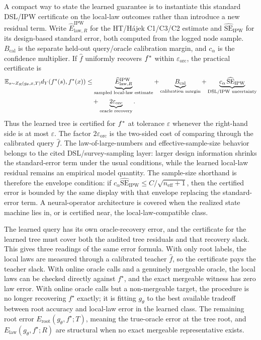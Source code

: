 A compact way to state the learned guarantee is to instantiate this standard
DSL/IPW certificate on the local-law outcomes rather than introduce a new
residual term. Write
\(\widehat E_{\mathrm{law},R}^{\mathrm{IPW}}\) for the HT/H\'ajek
C1/C3/C2 estimate and \(\widehat{\mathrm{SE}}_{\mathrm{IPW}}\) for its
design-based standard error, both computed from the logged node sample.
\(B_{\mathrm{cal}}\) is the separate held-out query/oracle calibration margin,
and \(c_\alpha\) is the confidence multiplier. If \(\widehat f\)
uniformly recovers \(f^\ast\) within \(\varepsilon_{\mathrm{orc}}\), the
practical certificate is
\[
\begin{aligned}
  \mathbb E_{s\sim Z_R(g_\theta,x,T)}
  d_Y(f^\ast(s),f^\ast(x))
  &\le
  \underbrace{\widehat E_{\mathrm{law},R}^{\mathrm{IPW}}}
    _{\text{sampled local-law estimate}}
  +
  \underbrace{B_{\mathrm{cal}}}
    _{\text{calibration margin}}
  +
  \underbrace{c_\alpha\,\widehat{\mathrm{SE}}_{\mathrm{IPW}}}
    _{\text{DSL/IPW uncertainty}} \\
  &\quad+
  \underbrace{2\varepsilon_{\mathrm{orc}}}
    _{\text{oracle recovery}} .
\end{aligned}
\]
Thus the learned tree is certified for \(f^\ast\) at tolerance
\(\varepsilon\) whenever the right-hand side is at most \(\varepsilon\).
The factor \(2\varepsilon_{\mathrm{orc}}\) is the two-sided cost of comparing
through the calibrated query \(\widehat f\). The law-of-large-numbers and
effective-sample-size behavior belongs to the cited DSL/survey-sampling layer:
larger design information shrinks the standard-error term under the usual
conditions, while the learned local-law residual remains an empirical model
quantity. The sample-size shorthand is therefore the envelope condition:
if \(c_\alpha\widehat{\mathrm{SE}}_{\mathrm{IPW}}\le
C/\sqrt{n_{\mathrm{eff}}+1}\), then the certified error is bounded by the same
display with that envelope replacing the standard-error term. A
neural-operator architecture is covered when the realized state machine lies
in, or is certified near, the local-law-compatible class.

The learned query has its own oracle-recovery error, and the
certificate for the learned tree must cover both the audited tree
residuals and that recovery slack. This gives three readings of
the same error formula. With only root labels, the local laws are
measured through a calibrated teacher \(\widehat f\), so the
certificate pays the teacher slack. With online oracle calls and a
genuinely mergeable oracle, the local laws can be checked directly
against \(f^\star\), and the exact mergeable witness has zero law
error. With online oracle calls but a non-mergeable target, the
procedure is no longer recovering \(f^\star\) exactly; it is fitting
\(g_\theta\) to the best available tradeoff between root accuracy and
local-law error in the learned class. The remaining root error
\(E_{\mathrm{root}}(g_\theta,f^\star;T)\), meaning the true-oracle
error at the tree root, and
\(E_{\mathrm{law}}(g_\theta,f^\star;R)\) are structural when no exact
mergeable representative exists.

